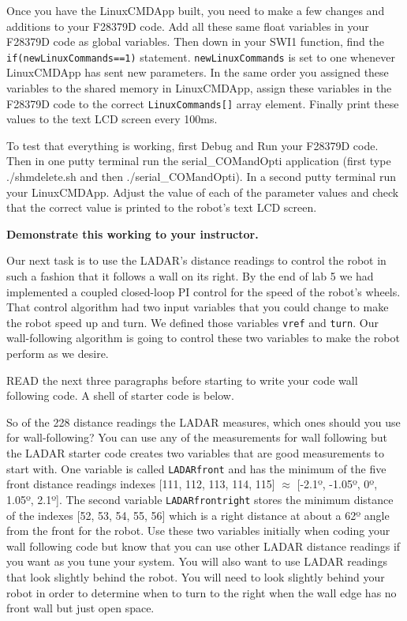 \documentclass[11pt]{article}
\begin{document}
    Once you have the LinuxCMDApp built, you need to make a few changes and additions to your F28379D code. Add all these same float variables in your F28379D code as global variables. Then down in your SWI1 function, find the \texttt{if(newLinuxCommands==1)} statement. \texttt{newLinuxCommands} is set to one whenever LinuxCMDApp has sent new parameters. In the same order you assigned these variables to the shared memory in LinuxCMDApp, assign these variables in the F28379D code to the correct \texttt{LinuxCommands[]} array element. Finally print these values to the text LCD screen every 100ms.

    To test that everything is working, first Debug and Run your F28379D code. Then in one putty terminal run the serial\_COMandOpti application (first type ./shmdelete.sh and then ./serial\_COMandOpti). In a second putty terminal run your LinuxCMDApp. Adjust the value of each of the parameter values and check that the correct value is printed to the robot’s text LCD screen.
    \begin{checkoff}
            \textbf{Demonstrate this working to your instructor.}
    \end{checkoff}

    Our next task is to use the LADAR’s distance readings to control the robot in such a fashion that it follows a wall on its right. By the end of lab 5 we had implemented a coupled closed-loop PI control for the speed of the robot’s wheels. That control algorithm had two input variables that you could change to make the robot speed up and turn. We defined those variables \texttt{vref} and \texttt{turn}. Our wall-following algorithm is going to control these two variables to make the robot perform as we desire.

    READ the next three paragraphs before starting to write your code wall following code. A shell of starter code is below.

    So of the 228 distance readings the LADAR measures, which ones should you use for wall-following? You can use any of the measurements for wall following but the LADAR starter code creates two variables that are good measurements to start with. One variable is called \texttt{LADARfront} and has the minimum of the five front distance readings indexes [111, 112, 113, 114, 115] $\approx$ [-2.1º, -1.05º, 0º, 1.05º, 2.1º]. The second variable \texttt{LADARfrontright} stores the minimum distance of the indexes [52, 53, 54, 55, 56] which is a right distance at about a 62º angle from the front for the robot. Use these two variables initially when coding your wall following code but know that you can use other LADAR distance readings if you want as you tune your system. You will also want to use LADAR readings that look slightly behind the robot. You will need to look slightly behind your robot in order to determine when to turn to the right when the wall edge has no front wall but just open space.
\end{document}
